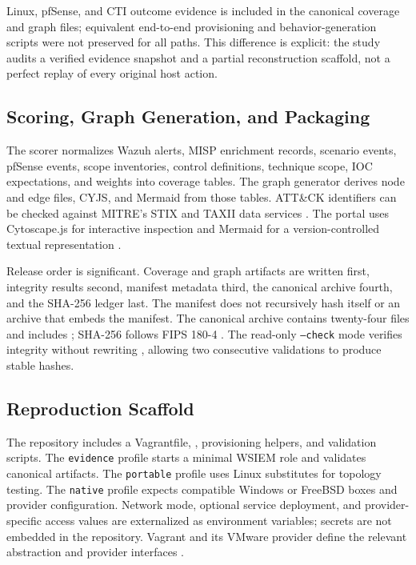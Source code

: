 \documentclass[a4paper,conference]{IEEEtran}
\begin{document}
Linux, pfSense, and CTI outcome evidence is included in the canonical coverage and graph files; equivalent end-to-end provisioning and behavior-generation scripts were not preserved for all paths. This difference is explicit: the study audits a verified evidence snapshot and a partial reconstruction scaffold, not a perfect replay of every original host action.

\subsection{Scoring, Graph Generation, and Packaging}
The scorer normalizes Wazuh alerts, MISP enrichment records, scenario events, pfSense events, scope inventories, control definitions, technique scope, IOC expectations, and weights into coverage tables. The graph generator derives node and edge files, CYJS, and Mermaid from those tables. ATT\&CK identifiers can be checked against MITRE's STIX and TAXII data services \cite{mitre_tools,oasis_stix,oasis_taxii}. The portal uses Cytoscape.js for interactive inspection and Mermaid for a version-controlled textual representation \cite{cytoscapejs,mermaid}.

Release order is significant. Coverage and graph artifacts are written first, integrity results second, manifest metadata third, the canonical archive fourth, and the SHA-256 ledger last. The manifest does not recursively hash itself or an archive that embeds the manifest. The canonical archive contains twenty-four files and includes ; SHA-256 follows FIPS 180-4 \cite{fips1804}. The read-only \texttt{--check} mode verifies integrity without rewriting , allowing two consecutive validations to produce stable hashes.

\subsection{Reproduction Scaffold}
The repository includes a Vagrantfile, , provisioning helpers, and validation scripts. The \texttt{evidence} profile starts a minimal WSIEM role and validates canonical artifacts. The \texttt{portable} profile uses Linux substitutes for topology testing. The \texttt{native} profile expects compatible Windows or FreeBSD boxes and provider configuration. Network mode, optional service deployment, and provider-specific access values are externalized as environment variables; secrets are not embedded in the repository. Vagrant and its VMware provider define the relevant abstraction and provider interfaces \cite{vagrant_docs,vagrant_vmware}.
\end{document}
